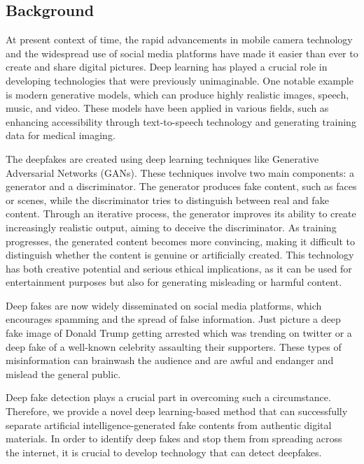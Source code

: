 \subsection{Background}
At present context of time, the rapid advancements in mobile camera technology and the widespread use of social media platforms have made it easier than ever to create and share digital pictures. Deep learning has played a crucial role in developing technologies that were previously unimaginable. One notable example is modern generative models, which can produce highly realistic images, speech, music, and video. These models have been applied in various fields, such as enhancing accessibility through text-to-speech technology and generating training data for medical imaging.

\noindent The deepfakes are created using deep learning techniques like Generative Adversarial Networks (GANs). These techniques involve two main components: a generator and a discriminator. The generator produces fake content, such as faces or scenes, while the discriminator tries to distinguish between real and fake content. Through an iterative process, the generator improves its ability to create increasingly realistic output, aiming to deceive the discriminator. As training progresses, the generated content becomes more convincing, making it difficult to distinguish whether the content is genuine or artificially created. This technology has both creative potential and serious ethical implications, as it can be used for entertainment purposes but also for generating misleading or harmful content.

\noindent Deep fakes are now widely disseminated on social media platforms, which encourages spamming and the spread of false information. Just picture a deep fake image of Donald Trump getting arrested which was trending on twitter or a deep fake of a well-known celebrity assaulting their supporters.
These types of misinformation can brainwash the audience and are awful and endanger and mislead the general public.

\noindent Deep fake detection plays a crucial part in overcoming such a circumstance. Therefore, we provide a novel deep learning-based method that can successfully separate artificial intelligence-generated fake contents from authentic digital materials. In order to identify deep fakes and stop them from spreading across the internet, it is crucial to develop technology that can detect deepfakes.